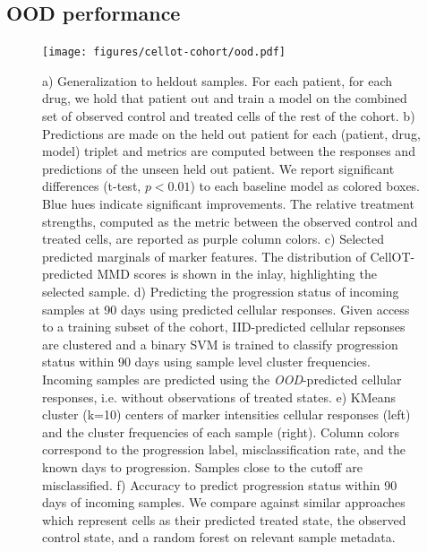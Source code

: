 \subsection{OOD performance}
\begin{figure}[ht!]
  \label{fig:ood-main}
  \begin{center}
    \texttt{[image: figures/cellot-cohort/ood.pdf]}
  \end{center}
  \caption{
    a) Generalization to heldout samples. For each patient, for each drug, we hold that patient out and train a model on the combined set of observed control and treated cells of the rest of the cohort.
    b) Predictions are made on the held out patient for each (patient, drug, model) triplet and metrics are computed between the responses and predictions of the unseen held out patient.
    We report significant differences (t-test, $p < 0.01$) to each baseline model as colored boxes. Blue hues indicate significant improvements.
    The relative treatment strengths, computed as the metric between the observed control and treated cells, are reported as purple column colors.
    c) Selected predicted marginals of marker features.
    The distribution of CellOT-predicted MMD scores is shown in the inlay, highlighting the selected sample.
    d) Predicting the progression status of incoming samples at 90 days using predicted cellular responses.
    Given access to a training subset of the cohort, IID-predicted cellular repsonses are clustered and a binary SVM is trained to classify progression status within 90 days using sample level cluster frequencies.
    Incoming samples are predicted using the \emph{OOD}-predicted cellular responses, i.e. without observations of treated states.
    e) KMeans cluster (k=10) centers of marker intensities cellular responses (left) and the cluster frequencies of each sample (right).
    Column colors correspond to the progression label, misclassification rate, and the known days to progression. Samples close to the cutoff are misclassified.
    f) Accuracy to predict progression status within 90 days of incoming samples.
    We compare against similar approaches which represent cells as their predicted treated state, the observed control state, and a random forest on relevant sample metadata.
  }
\end{figure}

